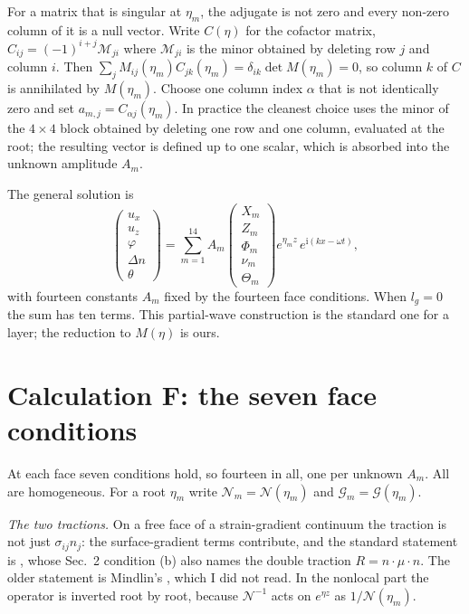 \documentclass[11pt]{article}
\makeatletter
\newif\ifshowworked
\newenvironment{worked}{%
  \ifshowworked\par\smallskip\noindent\textit{Working.}\par\smallskip\else
  \setbox\z@\vbox\bgroup\fi}{\ifshowworked\par\smallskip\else\egroup\fi}
\newcommand{\ii}{\mathrm{i}}
\newcommand{\Ncal}{\mathcal{N}}
\newcommand{\Gcal}{\mathcal{G}}
\makeatother
\begin{document}
\begin{worked}
For a matrix that is singular at $\eta_m$, the adjugate is not zero and every non-zero column of it is a
null vector. Write $C(\eta)$ for the cofactor matrix, $C_{ij}=(-1)^{i+j}\mathcal{M}_{ji}$ where
$\mathcal M_{ji}$ is the minor obtained by deleting row $j$ and column $i$. Then
$\sum_j M_{ij}(\eta_m)C_{jk}(\eta_m)=\delta_{ik}\det M(\eta_m)=0$, so column $k$ of $C$ is annihilated
by $M(\eta_m)$. Choose one column index $\alpha$ that is not identically zero and set
$a_{m,j}=C_{\alpha j}(\eta_m)$.
In practice the cleanest choice uses the minor of the $4\times4$ block obtained by deleting one row and
one column, evaluated at the root; the resulting vector is defined up to one scalar, which is absorbed into
the unknown amplitude $A_m$.
\end{worked}

The general solution is
\begin{equation}
\begin{pmatrix}u_x\\u_z\\\varphi\\\Delta n\\\theta\end{pmatrix}
=\sum_{m=1}^{14}A_m
\begin{pmatrix}X_m\\Z_m\\\Phi_m\\\nu_m\\\Theta_m\end{pmatrix}
e^{\eta_m z}\,e^{\ii(kx-\omega t)},
\label{eq:solution}
\end{equation}
with fourteen constants $A_m$ fixed by the fourteen face conditions. When $l_g=0$ the sum has ten terms.
This partial-wave construction is the standard one for a layer; the reduction to $M(\eta)$ is ours.

\section{Calculation F: the seven face conditions}\label{sec:calcF}

At each face seven conditions hold, so fourteen in all, one per unknown $A_m$. All are homogeneous. For a
root $\eta_m$ write $\Ncal_m=\Ncal(\eta_m)$ and $\Gcal_m=\Gcal(\eta_m)$.

\emph{The two tractions.} On a free face of a strain-gradient continuum the traction is not just
$\sigma_{ij}n_j$: the surface-gradient terms contribute, and the standard statement is
\cite[Sec.~2, Eq.~(14)]{Charal2019}, whose Sec.~2 condition (b) also names the double traction
$R=n\cdot\mu\cdot n$. The older statement is Mindlin's \cite{Mindlin1964}, which I did not read. In the
nonlocal part the operator is inverted root by root, because $\Ncal^{-1}$ acts on $e^{\eta z}$ as
$1/\Ncal(\eta_m)$.
\end{document}
